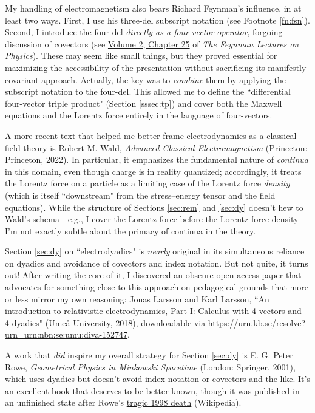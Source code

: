 \documentclass[12pt]{article}
\begin{document}
My handling of electromagnetism also bears Richard Feynman's influence, in at least two ways. First, I use his three-del subscript notation (see Footnote \ref{fn:fsn}). Second, I introduce the four-del \emph{directly as a four-vector operator}, forgoing discussion of covectors (see \href{https://www.feynmanlectures.caltech.edu/II_25.html#Ch25-S3}{Volume 2, Chapter 25} of \emph{The Feynman Lectures on Physics}). These may seem like small things, but they proved essential for maximizing the accessibility of the presentation without sacrificing its manifestly covariant approach. Actually, the key was to \emph{combine} them by applying the subscript notation to the four-del. This allowed me to define the ``differential four-vector triple product" (Section \ref{sssec:tp}) and cover both the Maxwell equations and the Lorentz force entirely in the language of four-vectors.

A more recent text that helped me better frame electrodynamics as a classical field theory is Robert M. Wald, \emph{Advanced Classical Electromagnetism} (Princeton: Princeton, 2022). In particular, it emphasizes the fundamental nature of \emph{continua} in this domain, even though charge is in reality quantized; accordingly, it treats the Lorentz force on a particle as a limiting case of the Lorentz force \emph{density} (which is itself ``downstream" from the stress--energy tensor and the field equations). While the structure of Sections \ref{sec:rem} and \ref{sec:dy} doesn't hew to Wald's schema---e.g., I cover the Lorentz force before the Lorentz force density---I'm not exactly subtle about the primacy of continua in the theory.

Section \ref{sec:dy} on ``electrodyadics" is \emph{nearly} original in its simultaneous reliance on dyadics and avoidance of covectors and index notation. But not quite, it turns out! After writing the core of it, I discovered an obscure open-access paper that advocates for something close to this approach on pedagogical grounds that more or less mirror my own reasoning: Jonas Larsson and Karl Larsson, ``An introduction to relativistic electrodynamics, Part I: Calculus with 4-vectors and 4-dyadics" (Ume\aa{} University, 2018), downloadable via {\url{https://urn.kb.se/resolve?urn=urn:nbn:se:umu:diva-152747}}.

A work that \emph{did} inspire my overall strategy for Section \ref{sec:dy} is E. G. Peter Rowe, \emph{Geometrical Physics in Minkowski Spacetime} (London: Springer, 2001), which uses dyadics but doesn't avoid index notation or covectors and the like. It's an excellent book that deserves to be better known, though it was published in an unfinished state after Rowe's \href{https://en.wikipedia.org/wiki/December_1998_tourist_kidnappings_in_Yemen}{tragic 1998 death} (Wikipedia).
\end{document}

